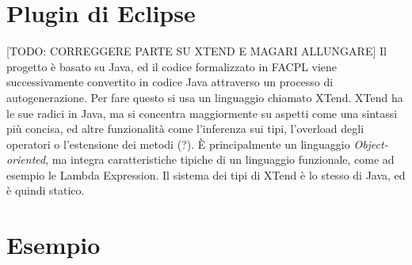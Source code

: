 \section{Plugin di Eclipse} %
\label{sec:plugin_eclipse}
[TODO: CORREGGERE PARTE SU XTEND E MAGARI ALLUNGARE]
Il progetto è basato su Java, ed il codice formalizzato in FACPL viene successivamente convertito in codice Java attraverso un processo di autogenerazione.
Per fare questo si usa un linguaggio chiamato XTend.
XTend ha le sue radici in Java, ma si concentra maggiormente su aspetti come una sintassi più concisa, ed altre funzionalità come l'inferenza sui tipi, l'overload degli operatori o l'estensione dei metodi (?). 
È principalmente un linguaggio \textit{Object-oriented}, ma integra caratteristiche tipiche di un linguaggio funzionale, come ad esempio le Lambda Expression. Il sistema dei tipi di XTend è lo stesso di Java, ed è quindi statico.\\ \par

\section{Esempio}
\label{sec:esempio}

